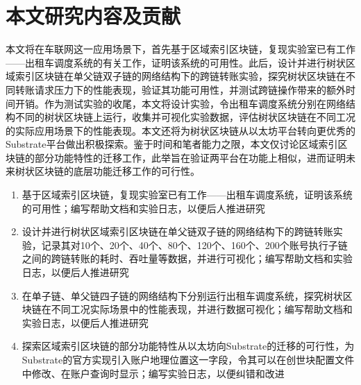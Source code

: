 \section{本文研究内容及贡献}

本文将在车联网这一应用场景下，首先基于区域索引区块链，复现实验室已有工作——出租车调度系统的有关工作，证明该系统的可用性。此后，设计并进行树状区域索引区块链在单父链双子链的网络结构下的跨链转账实验，探究树状区块链在不同转账请求压力下的性能表现，验证其功能可用性，并测试跨链操作带来的额外时间开销。作为测试实验的收尾，本文将设计实验，令出租车调度系统分别在网络结构不同的树状区块链上运行，收集并可视化实验数据，评估树状区块链在不同工况的实际应用场景下的性能表现。本文还将为树状区块链从以太坊平台转向更优秀的Substrate平台做出积极探索。鉴于时间和笔者能力之限，本文仅讨论区域索引区块链的部分功能特性的迁移工作，此举旨在验证两平台在功能上相似，进而证明未来树状区块链的底层功能迁移工作的可行性。

\begin{enumerate}
  \item 基于区域索引区块链，复现实验室已有工作——出租车调度系统，证明该系统的可用性；编写帮助文档和实验日志，以便后人推进研究
  \item 设计并进行树状区域索引区块链在单父链双子链的网络结构下的跨链转账实验，记录其对10个、20个、40个、80个、120个、160个、200个账号执行子链之间的跨链转账的耗时、吞吐量等数据，并进行可视化；编写帮助文档和实验日志，以便后人推进研究
  \item 在单子链、单父链四子链的网络结构下分别运行出租车调度系统，探究树状区块链在不同工况实际场景中的性能表现，并进行数据可视化；编写帮助文档和实验日志，以便后人推进研究
  \item 探索区域索引区块链的部分功能特性从以太坊向Substrate的迁移的可行性，为Substrate的官方实现引入账户地理位置这一字段，令其可以在创世块配置文件中修改、在账户查询时显示；编写实验日志，以便纠错和改进
\end{enumerate}








